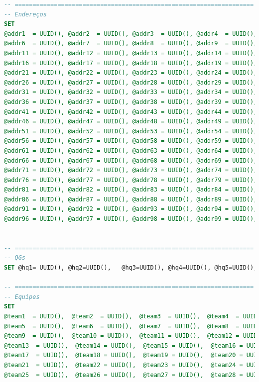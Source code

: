\documentclass[12pt,a4paper]{report}
\begin{document}
\begin{lstlisting}[language=SQL, caption=population.sql]
-- ===================================================================
-- Endereços
SET
@addr1  = UUID(), @addr2  = UUID(), @addr3  = UUID(), @addr4  = UUID(), @addr5  = UUID(),
@addr6  = UUID(), @addr7  = UUID(), @addr8  = UUID(), @addr9  = UUID(), @addr10 = UUID(),
@addr11 = UUID(), @addr12 = UUID(), @addr13 = UUID(), @addr14 = UUID(), @addr15 = UUID(),
@addr16 = UUID(), @addr17 = UUID(), @addr18 = UUID(), @addr19 = UUID(), @addr20 = UUID(),
@addr21 = UUID(), @addr22 = UUID(), @addr23 = UUID(), @addr24 = UUID(), @addr25 = UUID(),
@addr26 = UUID(), @addr27 = UUID(), @addr28 = UUID(), @addr29 = UUID(), @addr30 = UUID(),
@addr31 = UUID(), @addr32 = UUID(), @addr33 = UUID(), @addr34 = UUID(), @addr35 = UUID(),
@addr36 = UUID(), @addr37 = UUID(), @addr38 = UUID(), @addr39 = UUID(), @addr40 = UUID(),
@addr41 = UUID(), @addr42 = UUID(), @addr43 = UUID(), @addr44 = UUID(), @addr45 = UUID(),
@addr46 = UUID(), @addr47 = UUID(), @addr48 = UUID(), @addr49 = UUID(), @addr50 = UUID(),
@addr51 = UUID(), @addr52 = UUID(), @addr53 = UUID(), @addr54 = UUID(), @addr55 = UUID(),
@addr56 = UUID(), @addr57 = UUID(), @addr58 = UUID(), @addr59 = UUID(), @addr60 = UUID(),
@addr61 = UUID(), @addr62 = UUID(), @addr63 = UUID(), @addr64 = UUID(), @addr65 = UUID(),
@addr66 = UUID(), @addr67 = UUID(), @addr68 = UUID(), @addr69 = UUID(), @addr70 = UUID(),
@addr71 = UUID(), @addr72 = UUID(), @addr73 = UUID(), @addr74 = UUID(), @addr75 = UUID(),
@addr76 = UUID(), @addr77 = UUID(), @addr78 = UUID(), @addr79 = UUID(), @addr80 = UUID(),
@addr81 = UUID(), @addr82 = UUID(), @addr83 = UUID(), @addr84 = UUID(), @addr85 = UUID(),
@addr86 = UUID(), @addr87 = UUID(), @addr88 = UUID(), @addr89 = UUID(), @addr90 = UUID(),
@addr91 = UUID(), @addr92 = UUID(), @addr93 = UUID(), @addr94 = UUID(), @addr95 = UUID(),
@addr96 = UUID(), @addr97 = UUID(), @addr98 = UUID(), @addr99 = UUID(), @addr100 = UUID();


-- ===================================================================
-- QGs
SET @hq1= UUID(), @hq2=UUID(),   @hq3=UUID(), @hq4=UUID(), @hq5=UUID(), @hq6=UUID();

-- ===================================================================
-- Equipes
SET
@team1  = UUID(),  @team2  = UUID(),  @team3  = UUID(),  @team4  = UUID(),
@team5  = UUID(),  @team6  = UUID(),  @team7  = UUID(),  @team8  = UUID(),
@team9  = UUID(),  @team10 = UUID(),  @team11 = UUID(),  @team12 = UUID(),
@team13  = UUID(),  @team14 = UUID(),  @team15 = UUID(),  @team16 = UUID(),
@team17  = UUID(),  @team18 = UUID(),  @team19 = UUID(),  @team20 = UUID(),
@team21  = UUID(),  @team22 = UUID(),  @team23 = UUID(),  @team24 = UUID(),
@team25  = UUID(),  @team26 = UUID(),  @team27 = UUID(),  @team28 = UUID();


\end{lstlisting}
\end{document}
